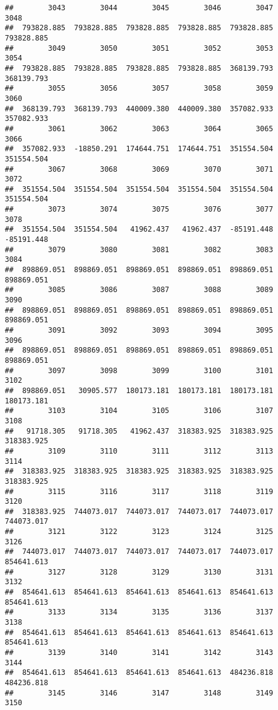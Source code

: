 \documentclass[
]{book}
\begin{document}
\begin{verbatim}
##        3043        3044        3045        3046        3047        3048 
##  793828.885  793828.885  793828.885  793828.885  793828.885  793828.885 
##        3049        3050        3051        3052        3053        3054 
##  793828.885  793828.885  793828.885  793828.885  368139.793  368139.793 
##        3055        3056        3057        3058        3059        3060 
##  368139.793  368139.793  440009.380  440009.380  357082.933  357082.933 
##        3061        3062        3063        3064        3065        3066 
##  357082.933  -18850.291  174644.751  174644.751  351554.504  351554.504 
##        3067        3068        3069        3070        3071        3072 
##  351554.504  351554.504  351554.504  351554.504  351554.504  351554.504 
##        3073        3074        3075        3076        3077        3078 
##  351554.504  351554.504   41962.437   41962.437  -85191.448  -85191.448 
##        3079        3080        3081        3082        3083        3084 
##  898869.051  898869.051  898869.051  898869.051  898869.051  898869.051 
##        3085        3086        3087        3088        3089        3090 
##  898869.051  898869.051  898869.051  898869.051  898869.051  898869.051 
##        3091        3092        3093        3094        3095        3096 
##  898869.051  898869.051  898869.051  898869.051  898869.051  898869.051 
##        3097        3098        3099        3100        3101        3102 
##  898869.051   30905.577  180173.181  180173.181  180173.181  180173.181 
##        3103        3104        3105        3106        3107        3108 
##   91718.305   91718.305   41962.437  318383.925  318383.925  318383.925 
##        3109        3110        3111        3112        3113        3114 
##  318383.925  318383.925  318383.925  318383.925  318383.925  318383.925 
##        3115        3116        3117        3118        3119        3120 
##  318383.925  744073.017  744073.017  744073.017  744073.017  744073.017 
##        3121        3122        3123        3124        3125        3126 
##  744073.017  744073.017  744073.017  744073.017  744073.017  854641.613 
##        3127        3128        3129        3130        3131        3132 
##  854641.613  854641.613  854641.613  854641.613  854641.613  854641.613 
##        3133        3134        3135        3136        3137        3138 
##  854641.613  854641.613  854641.613  854641.613  854641.613  854641.613 
##        3139        3140        3141        3142        3143        3144 
##  854641.613  854641.613  854641.613  854641.613  484236.818  484236.818 
##        3145        3146        3147        3148        3149        3150 

\end{verbatim}
\end{document}

